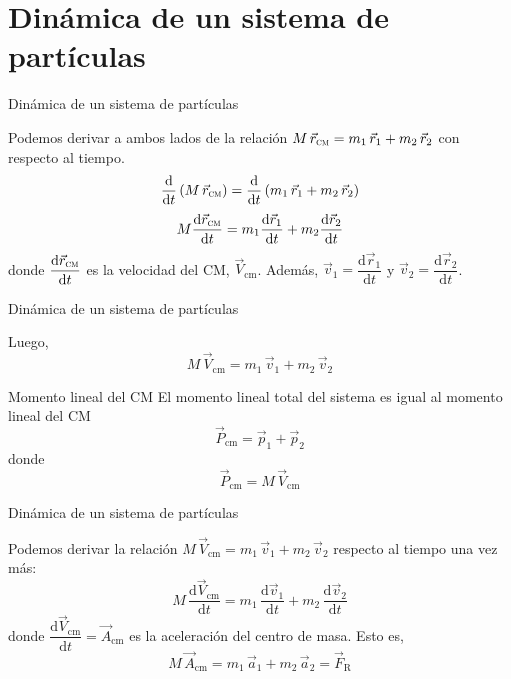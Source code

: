 \documentclass[11pt,handout,aspectratio=1610]{beamer}
\newcommand{\fdiff}[2]{\dfrac{\text{d} #1}{\text{d} #2}}
\begin{document}
\section{Dinámica de un sistema de partículas}

\begin{frame}{Dinámica de un sistema de partículas}

    Podemos derivar a ambos lados de la relación $M \, \vec{r}_{\textsc{cm}} = m_1 \, \vec{r}_1 + m_2 \, \vec{r}_2$ con respecto al tiempo. \pause $$\fdiff{}{t} \left(M \, \vec{r}_{\textsc{cm}}\right) = \fdiff{}{t} \left(m_1 \, \vec{r}_1 + m_2 \, \vec{r}_2\right)$$ \pause $$M \fdiff{\vec{r}_{\textsc{cm}}}{t} = m_1 \fdiff{\vec{r}_1}{t} + m_2 \fdiff{\vec{r}_2}{t}$$ donde $\fdiff{\vec{r}_{\textsc{cm}}}{t}$ es la velocidad del CM, $\vec{V}_\text{cm}$. Además, $\vec{v}_1 = \fdiff{\vec{r}_1}{t}$ y $\vec{v}_2 = \fdiff{\vec{r}_2}{t}$.

\end{frame}

\begin{frame}{Dinámica de un sistema de partículas}

    Luego, $$M \, \vec{V}_\text{cm} = m_1 \, \vec{v}_1 + m_2 \, \vec{v}_2$$ \pause
    \begin{block}{Momento lineal del CM}
        El momento lineal total del sistema es igual al momento lineal del CM $$\vec{P}_\text{cm} = \vec{p}_1 + \vec{p}_2$$ \pause donde $$\vec{P}_\text{cm} = M \, \vec{V}_\text{cm}$$
    \end{block}

\end{frame}

\begin{frame}{Dinámica de un sistema de partículas}

    Podemos derivar la relación $M \, \vec{V}_\text{cm} = m_1 \, \vec{v}_1 + m_2 \, \vec{v}_2$ respecto al tiempo una vez más: $$M \, \fdiff{\vec{V}_\text{cm}}{t} = m_1 \, \fdiff{\vec{v}_1}{t} + m_2 \, \fdiff{\vec{v}_2}{t}$$ donde $\fdiff{\vec{V}_\text{cm}}{t} = \vec{A}_\text{cm}$ es la aceleración del centro de masa. \pause Esto es, $$M \, \vec{A}_\text{cm} = m_1 \, \vec{a}_1 + m_2 \, \vec{a}_2 = \vec{F}_\text{R}$$ 

\end{frame}
\end{document}

